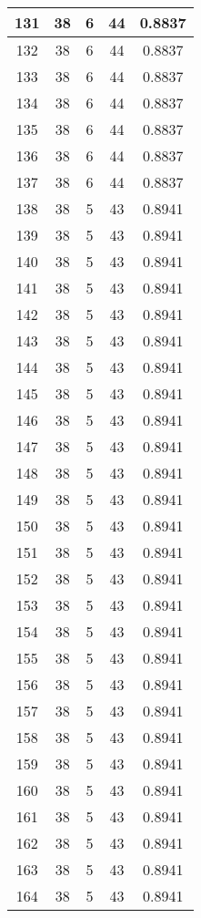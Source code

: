 \documentclass[letterpaper, 12pt]{article}
\begin{document}
\begin{longtable}{|c|c|c|c|c|}
\hline
131 & 38 & 6 & 44 & 0.8837 \\
\hline
132 & 38 & 6 & 44 & 0.8837 \\
\hline
133 & 38 & 6 & 44 & 0.8837 \\
\hline
134 & 38 & 6 & 44 & 0.8837 \\
\hline
135 & 38 & 6 & 44 & 0.8837 \\
\hline
136 & 38 & 6 & 44 & 0.8837 \\
\hline
137 & 38 & 6 & 44 & 0.8837 \\
\hline
138 & 38 & 5 & 43 & 0.8941 \\
\hline
139 & 38 & 5 & 43 & 0.8941 \\
\hline
140 & 38 & 5 & 43 & 0.8941 \\
\hline
141 & 38 & 5 & 43 & 0.8941 \\
\hline
142 & 38 & 5 & 43 & 0.8941 \\
\hline
143 & 38 & 5 & 43 & 0.8941 \\
\hline
144 & 38 & 5 & 43 & 0.8941 \\
\hline
145 & 38 & 5 & 43 & 0.8941 \\
\hline
146 & 38 & 5 & 43 & 0.8941 \\
\hline
147 & 38 & 5 & 43 & 0.8941 \\
\hline
148 & 38 & 5 & 43 & 0.8941 \\
\hline
149 & 38 & 5 & 43 & 0.8941 \\
\hline
150 & 38 & 5 & 43 & 0.8941 \\
\hline
151 & 38 & 5 & 43 & 0.8941 \\
\hline
152 & 38 & 5 & 43 & 0.8941 \\
\hline
153 & 38 & 5 & 43 & 0.8941 \\
\hline
154 & 38 & 5 & 43 & 0.8941 \\
\hline
155 & 38 & 5 & 43 & 0.8941 \\
\hline
156 & 38 & 5 & 43 & 0.8941 \\
\hline
157 & 38 & 5 & 43 & 0.8941 \\
\hline
158 & 38 & 5 & 43 & 0.8941 \\
\hline
159 & 38 & 5 & 43 & 0.8941 \\
\hline
160 & 38 & 5 & 43 & 0.8941 \\
\hline
161 & 38 & 5 & 43 & 0.8941 \\
\hline
162 & 38 & 5 & 43 & 0.8941 \\
\hline
163 & 38 & 5 & 43 & 0.8941 \\
\hline
164 & 38 & 5 & 43 & 0.8941 \\

\end{longtable}
\end{document}
